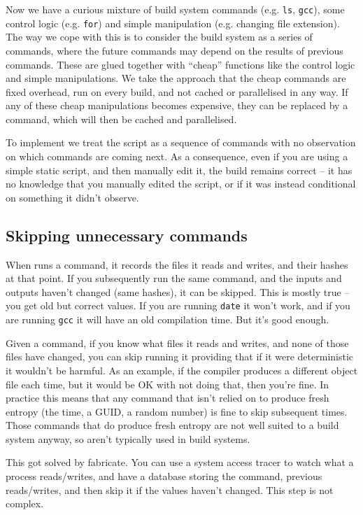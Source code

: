 Now we have a curious mixture of build system commands (e.g. \texttt{ls}, \texttt{gcc}), some control logic (e.g. \texttt{for}) and simple manipulation (e.g. changing file extension). The way we cope with this is to consider the build system as a series of commands, where the future commands may depend on the results of previous commands. These are glued together with ``cheap'' functions like the control logic and simple manipulations. We take the approach that the cheap commands are fixed overhead, run on every build, and not cached or parallelised in any way. If any of these cheap manipulations becomes expensive, they can be replaced by a command, which will then be cached and parallelised.

To implement \Rattle we treat the script as a sequence of commands with no observation on which commands are coming next. As a consequence, even if you are using a simple static script, and then manually edit it, the \Rattle build remains correct -- it has no knowledge that you manually edited the script, or if it was instead conditional on something it didn't observe.

\subsection{Skipping unnecessary commands}

When \Rattle runs a command, it records the files it reads and writes, and their hashes at that point. If you subsequently run the same command, and the inputs and outputs haven't changed (same hashes), it can be skipped. This is mostly true -- you get old but correct values. If you are running \texttt{date} it won't work, and if you are running \texttt{gcc} it will have an old compilation time. But it's good enough.

Given a command, if you know what files it reads and writes, and none of those files have changed, you can skip running it providing that if it were deterministic it wouldn't be harmful. As an example, if the compiler produces a different object file each time, but it would be OK with not doing that, then you're fine. In practice this means that any command that isn't relied on to produce fresh entropy (the time, a GUID, a random number) is fine to skip subsequent times. Those commands that do produce fresh entropy are not well suited to a build system anyway, so aren't typically used in build systems.

This got solved by fabricate. You can use a system access tracer to watch what a process reads/writes, and have a database storing the command, previous reads/writes, and then skip it if the values haven't changed. This step is not complex.

